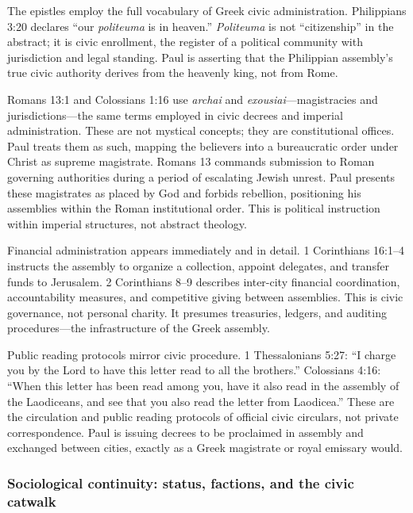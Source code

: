 The epistles employ the full vocabulary of Greek civic administration.
Philippians 3:20 declares ``our \textit{politeuma} is in heaven.''
\textit{Politeuma} is not ``citizenship'' in the abstract; it is civic enrollment, the register of a political community with jurisdiction and legal standing.
Paul is asserting that the Philippian assembly's true civic authority derives from the heavenly king, not from Rome.

Romans 13:1 and Colossians 1:16 use \textit{archai} and \textit{exousiai}---magistracies and jurisdictions---the same terms employed in civic decrees and imperial administration.
These are not mystical concepts; they are constitutional offices.
Paul treats them as such, mapping the believers into a bureaucratic order under Christ as supreme magistrate.
Romans 13 commands submission to Roman governing authorities during a period of escalating Jewish unrest.
Paul presents these magistrates as placed by God and forbids rebellion, positioning his assemblies within the Roman institutional order.
This is political instruction within imperial structures, not abstract theology.

Financial administration appears immediately and in detail.
1 Corinthians 16:1--4 instructs the assembly to organize a collection, appoint delegates, and transfer funds to Jerusalem.
2 Corinthians 8--9 describes inter-city financial coordination, accountability measures, and competitive giving between assemblies.
This is civic governance, not personal charity.
It presumes treasuries, ledgers, and auditing procedures---the infrastructure of the Greek assembly.

Public reading protocols mirror civic procedure.
1 Thessalonians 5:27: ``I charge you by the Lord to have this letter read to all the brothers.''
Colossians 4:16: ``When this letter has been read among you, have it also read in the assembly of the Laodiceans, and see that you also read the letter from Laodicea.''
These are the circulation and public reading protocols of official civic circulars, not private correspondence.
Paul is issuing decrees to be proclaimed in assembly and exchanged between cities, exactly as a Greek magistrate or royal emissary would.

\subsubsection{Sociological continuity: status, factions, and the civic catwalk}\label{subsubsec:sociological-continuity-status-factions-and-the-civic-catwalk}


